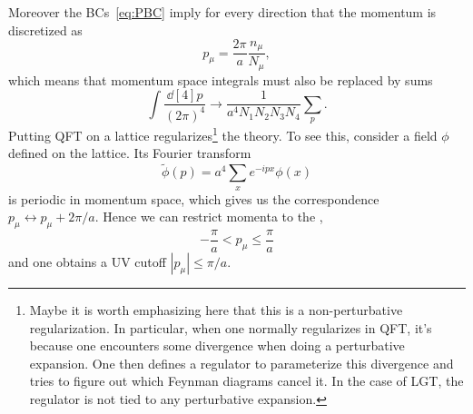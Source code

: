 Moreover the BCs~\eqref{eq:PBC} imply for every direction
that the momentum is discretized as
\begin{equation}
  p_\mu=\frac{2\pi}{a}\frac{n_\mu}{N_\mu},
\end{equation}
which means that momentum space integrals must also be replaced by
sums
\begin{equation}
  \int\frac{\dd[4]{p}}{(2\pi)^4}\to
  \frac{1}{a^4N_1N_2N_3N_4}\sum_p. 
\end{equation}
Putting QFT on a lattice regularizes\footnote{Maybe it is worth
emphasizing here that this is a non-perturbative regularization. 
In particular, when one normally regularizes in QFT, it's because
one encounters some divergence when doing a perturbative
expansion. One then defines a regulator to parameterize this
divergence and tries to figure out which Feynman diagrams 
cancel it. In the case of LGT, the regulator is not tied to
any perturbative expansion.} the theory. 
To see this, consider a field $\phi$ defined on the lattice. 
Its Fourier transform
\begin{equation}
  \widetilde{\phi}(p)=a^4\sum_xe^{-ipx}\phi(x)
\end{equation}
is periodic in momentum space, which gives us the correspondence
$p_\mu\leftrightarrow p_\mu+2\pi/a$. Hence we can restrict
momenta to the ,
\begin{equation}
 -\frac{\pi}{a}<p_\mu\le\frac{\pi}{a}
\end{equation}
and one obtains a UV cutoff $|p_\mu|\le\pi/a$.

